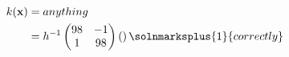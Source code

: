 \begin{align*}
	k(\mathbf{x}) & =anything                                                     \\
	              & =h^{-1}\begin{pmatrix}
		                       98 & -1 \\1& 98
	                       \end{pmatrix}\left(\right)\solnmarksplus{1}{correctly} \\
\end{align*}

